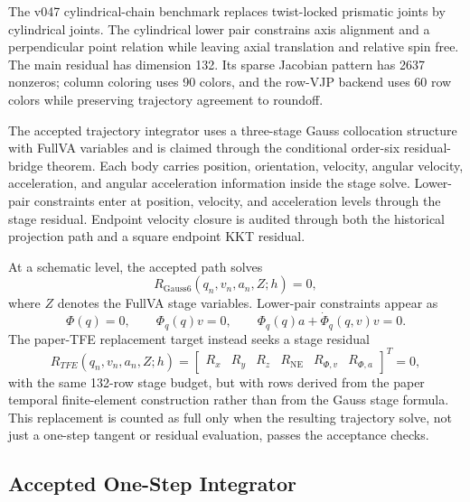 \documentclass[11pt]{article}
\newcommand{\tfe}{TFE}
\begin{document}
The v047 cylindrical-chain benchmark replaces twist-locked prismatic joints by
cylindrical joints.  The cylindrical lower pair constrains axis alignment and a
perpendicular point relation while leaving axial translation and relative spin
free.  The main residual has dimension 132.  Its sparse Jacobian pattern has
2637 nonzeros; column coloring uses 90 colors, and the row-VJP backend uses 60
row colors while preserving trajectory agreement to roundoff.

The accepted trajectory integrator uses a three-stage Gauss collocation
structure with FullVA variables and is claimed through the conditional
order-six residual-bridge theorem.  Each body carries position, orientation,
velocity, angular velocity, acceleration, and angular acceleration information
inside the stage solve.  Lower-pair constraints enter at position, velocity,
and acceleration levels through the stage residual.  Endpoint velocity closure
is audited through both the historical projection path and a square endpoint
KKT residual.

At a schematic level, the accepted path solves
\begin{equation}
  R_{\mathrm{Gauss6}}(q_n,v_n,a_n,Z;h)=0,
\end{equation}
where $Z$ denotes the FullVA stage variables.  Lower-pair constraints appear as
\begin{equation}
  \Phi(q)=0,\qquad
  \Phi_q(q)v=0,\qquad
  \Phi_q(q)a+\dot{\Phi}_q(q,v)v=0.
\end{equation}
The paper-\tfe{} replacement target instead seeks a stage residual
\begin{equation}
  R_{\tfe{}}(q_n,v_n,a_n,Z;h)=
  \begin{bmatrix}
  R_x & R_y & R_z & R_{\mathrm{NE}} & R_{\Phi,v} & R_{\Phi,a}
  \end{bmatrix}^{T}=0,
\end{equation}
with the same 132-row stage budget, but with rows derived from the paper
temporal finite-element construction rather than from the Gauss stage formula.
This replacement is counted as full only when the resulting trajectory solve,
not just a one-step tangent or residual evaluation, passes the acceptance
checks.

\subsection{Accepted One-Step Integrator}
\label{sec:accepted-one-step-integrator}
\end{document}
